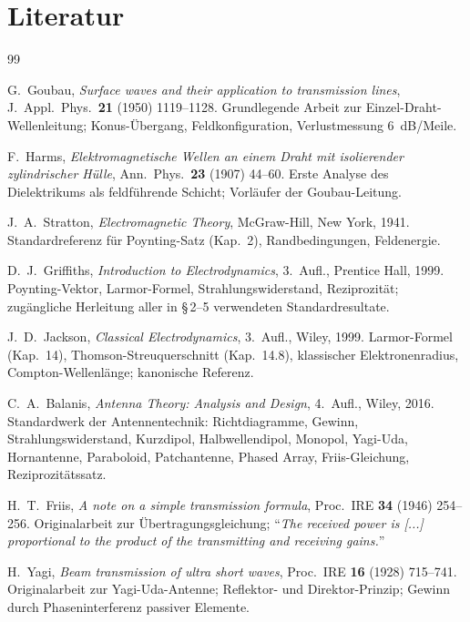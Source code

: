 \section*{Literatur}

\begin{thebibliography}{99}


G.~Goubau,
\textit{Surface waves and their application to transmission lines},
J.~Appl.~Phys.\ \textbf{21} (1950) 1119--1128.
Grundlegende Arbeit zur Einzel-Draht-Wellenleitung; Konus-Übergang,
Feldkonfiguration, Verlustmessung 6~dB/Meile.

F.~Harms,
\textit{Elektromagnetische Wellen an einem Draht mit isolierender
zylindrischer Hülle},
Ann.~Phys.\ \textbf{23} (1907) 44--60.
Erste Analyse des Dielektrikums als feldführende Schicht; Vorläufer der
Goubau-Leitung.

J.~A.~Stratton,
\textit{Electromagnetic Theory},
McGraw-Hill, New York, 1941.
Standardreferenz für Poynting-Satz (Kap.~2), Randbedingungen, Feldenergie.

D.~J.~Griffiths,
\textit{Introduction to Electrodynamics},
3.~Aufl., Prentice Hall, 1999.
Poynting-Vektor, Larmor-Formel, Strahlungswiderstand, Reziprozität;
zugängliche Herleitung aller in §\,2--5 verwendeten Standardresultate.

J.~D.~Jackson,
\textit{Classical Electrodynamics},
3.~Aufl., Wiley, 1999.
Larmor-Formel (Kap.~14), Thomson-Streuquerschnitt (Kap.~14.8),
klassischer Elektronenradius, Compton-Wellenlänge; kanonische Referenz.

C.~A.~Balanis,
\textit{Antenna Theory: Analysis and Design},
4.~Aufl., Wiley, 2016.
Standardwerk der Antennentechnik: Richtdiagramme, Gewinn, Strahlungswiderstand,
Kurzdipol, Halbwellendipol, Monopol, Yagi-Uda, Hornantenne, Paraboloid,
Patchantenne, Phased Array, Friis-Gleichung, Reziprozitätssatz.

H.~T.~Friis,
\textit{A note on a simple transmission formula},
Proc.~IRE \textbf{34} (1946) 254--256.
Originalarbeit zur Übertragungsgleichung;
``\textit{The received power is [...] proportional to the product of the
transmitting and receiving gains.}''

H.~Yagi,
\textit{Beam transmission of ultra short waves},
Proc.~IRE \textbf{16} (1928) 715--741.
Originalarbeit zur Yagi-Uda-Antenne; Reflektor- und Direktor-Prinzip;
Gewinn durch Phaseninterferenz passiver Elemente.


\end{thebibliography}
